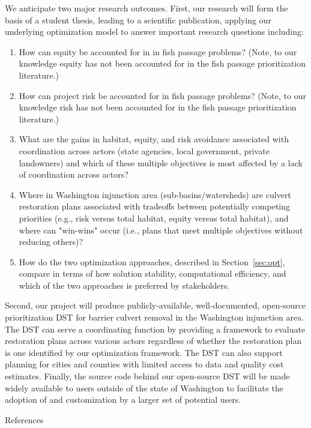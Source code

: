 \documentclass[12pt]{elsarticle}
\begin{document}
We anticipate two major research outcomes. First, our research will form the basis of a student thesis, leading to a scientific publication, applying our underlying optimization model to answer important research questions including:

\begin{enumerate}
\item How can equity be accounted for in in fish passage problems? (Note, to our knowledge equity has not been accounted for in the fish passage prioritization literature.)
\item How can project risk be accounted for in fish passage problems? (Note, to our knowledge risk has not been accounted for in the fish passage prioritization literature.)
\item What are the gains in habitat, equity, and risk avoidance associated with coordination across actors (state agencies, local government, private landowners) and which of these multiple objectives is most affected by a lack of coordination across actors?
\item Where in Washington injunction area (sub-basins/watersheds) are culvert restoration plans associated with tradeoffs between potentially competing priorities (e.g., risk versus total habitat, equity versus total habitat), and where can "win-wins" occur (i.e., plans that meet multiple objectives without reducing others)?
\item How do the two optimization approaches, described in Section~\ref{sec:opt}, compare in terms of how solution stability, computational efficiency, and which of the two approaches is preferred by stakeholders.
\end{enumerate}


Second, our project will produce publicly-available, well-documented, open-source prioritization DST for barrier culvert removal in the Washington injunction area. The DST can serve a coordinating function by providing a framework to evaluate restoration plans across various actors regardless of whether the restoration plan is one identified by our optimization framework. The DST can also support planning for cities and counties with limited access to data and quality cost estimates. Finally, the source code behind our open-source DST will be made widely available to users outside of the state of Washington to facilitate the adoption of and customization by a larger set of potential users. 


\clearpage
\large References\\
\normalsize

\end{document}
